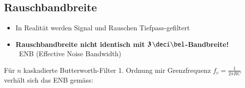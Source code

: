 




\subsection{Rauschbandbreite}

\begin{itemize}
    \item In Realität werden Signal und Rauschen Tiefpass-gefiltert
    \item \textbf{Rauschbandbreite nicht identisch mit $\bm{3 \, \deci \bel}$-Bandbreite!} \\
        \textrightarrow\ ENB (Effective Noise Bandwidth)
\end{itemize}

\vspace{0.2cm}
Für $n$ kaskadierte Butterworth-Filter 1. Ordnung mir Grenzfrequenz $f_c = \frac{1}{2 \pi R C}$ verhält sich das ENB gemäss:

